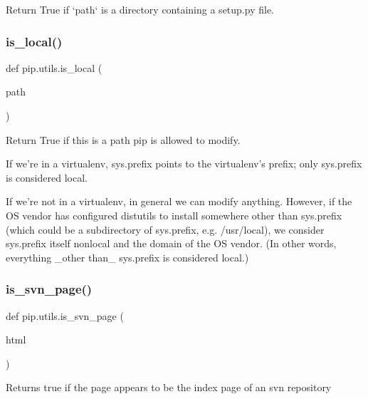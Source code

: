 \begin{DoxyVerb}Return True if `path` is a directory containing a setup.py file.\end{DoxyVerb}
 \mbox{\label{namespacepip_1_1utils_ad21ea3b5107add164a16ee06ea1a5235}} 
\subsubsection{\texorpdfstring{is\+\_\+local()}{is\_local()}}
{\footnotesize\ttfamily def pip.\+utils.\+is\+\_\+local (\begin{DoxyParamCaption}\item[{}]{path }\end{DoxyParamCaption})}

\begin{DoxyVerb}Return True if this is a path pip is allowed to modify.

If we're in a virtualenv, sys.prefix points to the virtualenv's
prefix; only sys.prefix is considered local.

If we're not in a virtualenv, in general we can modify anything.
However, if the OS vendor has configured distutils to install
somewhere other than sys.prefix (which could be a subdirectory of
sys.prefix, e.g. /usr/local), we consider sys.prefix itself nonlocal
and the domain of the OS vendor. (In other words, everything _other
than_ sys.prefix is considered local.)\end{DoxyVerb}
 \mbox{\label{namespacepip_1_1utils_a51d5a53fb1cd54954a9c656b79820b91}} 
\subsubsection{\texorpdfstring{is\+\_\+svn\+\_\+page()}{is\_svn\_page()}}
{\footnotesize\ttfamily def pip.\+utils.\+is\+\_\+svn\+\_\+page (\begin{DoxyParamCaption}\item[{}]{html }\end{DoxyParamCaption})}

\begin{DoxyVerb}Returns true if the page appears to be the index page of an svn repository
\end{DoxyVerb}
 \mbox{\label{namespacepip_1_1utils_af323d1b60753dd3167f8282c2b85a251}} 

